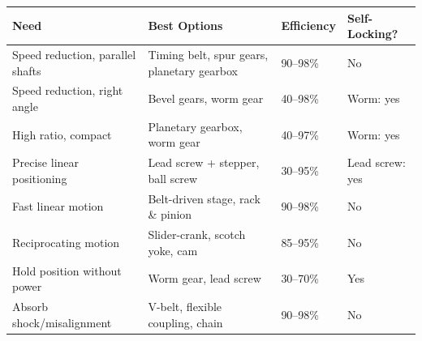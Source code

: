 \documentclass[11pt,letterpaper,twoside,openany]{book}
\begin{document}
\begin{center}
\small
\begin{tabularx}{\textwidth}{l X l l}
\toprule
\textbf{Need} & \textbf{Best Options} & \textbf{Efficiency} & \textbf{Self-Locking?} \\
\midrule
Speed reduction, parallel shafts & Timing belt, spur gears, planetary gearbox & 90--98\% & No \\
Speed reduction, right angle & Bevel gears, worm gear & 40--98\% & Worm: yes \\
High ratio, compact & Planetary gearbox, worm gear & 40--97\% & Worm: yes \\
Precise linear positioning & Lead screw + stepper, ball screw & 30--95\% & Lead screw: yes \\
Fast linear motion & Belt-driven stage, rack \& pinion & 90--98\% & No \\
Reciprocating motion & Slider-crank, scotch yoke, cam & 85--95\% & No \\
Hold position without power & Worm gear, lead screw & 30--70\% & Yes \\
Absorb shock/misalignment & V-belt, flexible coupling, chain & 90--98\% & No \\
\bottomrule
\end{tabularx}
\end{center}

\FloatBarrier
\end{document}
